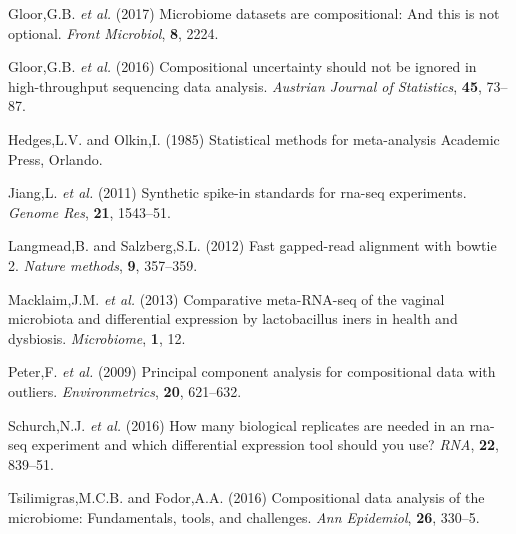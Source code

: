 \documentclass[onecolumn]{article}
\begin{document}
\leavevmode\hypertarget{ref-gloorFrontiers:2017}{}%
Gloor,G.B. \emph{et al.} (2017) Microbiome datasets are compositional:
And this is not optional. \emph{Front Microbiol}, \textbf{8}, 2224.

\leavevmode\hypertarget{ref-gloorAJS:2016}{}%
Gloor,G.B. \emph{et al.} (2016) Compositional uncertainty should not be
ignored in high-throughput sequencing data analysis. \emph{Austrian
Journal of Statistics}, \textbf{45}, 73--87.

\leavevmode\hypertarget{ref-Hedges:1985}{}%
Hedges,L.V. and Olkin,I. (1985) Statistical methods for meta-analysis
Academic Press, Orlando.

\leavevmode\hypertarget{ref-Jiang:2011aa}{}%
Jiang,L. \emph{et al.} (2011) Synthetic spike-in standards for rna-seq
experiments. \emph{Genome Res}, \textbf{21}, 1543--51.

\leavevmode\hypertarget{ref-bowtie2}{}%
Langmead,B. and Salzberg,S.L. (2012) Fast gapped-read alignment with
bowtie 2. \emph{Nature methods}, \textbf{9}, 357--359.

\leavevmode\hypertarget{ref-macklaim:2013}{}%
Macklaim,J.M. \emph{et al.} (2013) Comparative meta-RNA-seq of the
vaginal microbiota and differential expression by lactobacillus iners in
health and dysbiosis. \emph{Microbiome}, \textbf{1}, 12.

\leavevmode\hypertarget{ref-filmozer:2009}{}%
Peter,F. \emph{et al.} (2009) Principal component analysis for
compositional data with outliers. \emph{Environmetrics}, \textbf{20},
621--632.

\leavevmode\hypertarget{ref-Schurch:2016aa}{}%
Schurch,N.J. \emph{et al.} (2016) How many biological replicates are
needed in an rna-seq experiment and which differential expression tool
should you use? \emph{RNA}, \textbf{22}, 839--51.

\leavevmode\hypertarget{ref-Tsilimigras:2016aa}{}%
Tsilimigras,M.C.B. and Fodor,A.A. (2016) Compositional data analysis of
the microbiome: Fundamentals, tools, and challenges. \emph{Ann
Epidemiol}, \textbf{26}, 330--5.
\end{document}
